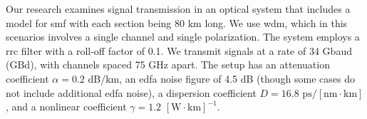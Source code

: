 Our research examines signal transmission in an optical system that includes a model for \gls{smf} with each section being 80 km long. We use \acrshort{wdm}, which in this scenarios involves a single channel and single polarization. The system employs a \acrlong{rrc} filter with a roll-off factor of 0.1. We transmit signals at a rate of 34 Gbaud (GBd), with channels spaced 75 GHz apart. The setup has an attenuation coefficient \( \alpha = 0.2 \) dB/km, an \acrshort{edfa} noise figure of 4.5 dB (though some cases do not include additional \acrshort{edfa} noise), a dispersion coefficient \( D = 16.8 \) $\textrm{ps}/[\textrm{nm} \cdot \textrm{km}]$, and a nonlinear coefficient $\gamma = 1.2$ $[\textrm{W} \cdot \textrm{km}]^{-1}$. 



